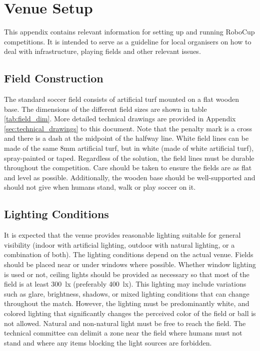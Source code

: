 \section{Venue Setup}
\label{sec:venue_setup}

This appendix contains relevant information for setting up and running RoboCup competitions. It is intended to serve as a guideline for local organisers on how to deal with infrastructure, playing fields and other relevant issues.

\subsection{Field Construction}
The standard soccer field consists of  artificial turf mounted on a flat wooden base. The dimensions of the different field sizes are shown in table \ref{tab:field_dim}. 
More detailed technical drawings are provided in Appendix \ref{sec:technical_drawings}  to this document.
Note that the penalty mark is a cross and there is a dash at the midpoint of the halfway line.
White field lines can be made of the same 8mm artificial turf, but in white (\eg made of white artificial turf), spray-painted or taped. 
Regardless of the solution, the field lines must be durable throughout the competition.
Care should be taken to ensure the fields are as flat and level as possible.
Additionally, the wooden base should be well-supported and should not give when humans stand, walk or play soccer on it.


\subsection{Lighting Conditions}
It is expected that the venue provides reasonable lighting suitable for general visibility (\eg indoor with artificial lighting, outdoor with natural lighting, or a combination of both).
The lighting conditions depend on the actual venue. 
Fields should be placed near or under windows where possible. 
Whether window lighting is used or not, ceiling lights should be provided as necessary so that most of the field is at least \qty{300}{\lux} (preferably \qty{400}{\lux}).
This lighting may include variations such as glare, brightness, shadows, or mixed lighting conditions that can change throughout the match.
However, the lighting must be predominantly white, and colored lighting that significantly changes the perceived color of the field or ball is not allowed.
Natural and non-natural light must be free to reach the field.
The technical committee can delimit a zone near the field where humans must not stand and where any items blocking the light sources are forbidden.

